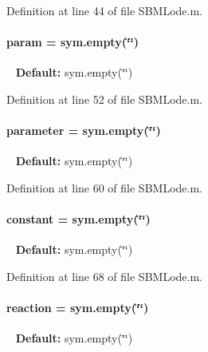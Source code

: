Definition at line 44 of file S\+B\+M\+Lode.\+m.

\hypertarget{class_s_b_m_lode_a51f20d6b1b54a2eee3be0e8adc96a0ae}{}
\paragraph[{param}]{\setlength{\rightskip}{0pt plus 5cm}param = sym.\+empty(\char`\"{}\char`\"{})}\label{class_s_b_m_lode_a51f20d6b1b54a2eee3be0e8adc96a0ae}
~\newline
{\bfseries Default\+:} sym.\+empty(\char`\"{}\char`\"{}) 

Definition at line 52 of file S\+B\+M\+Lode.\+m.

\hypertarget{class_s_b_m_lode_a0d71b5c1dcca8d3fee88d6a11d3e2071}{}
\paragraph[{parameter}]{\setlength{\rightskip}{0pt plus 5cm}parameter = sym.\+empty(\char`\"{}\char`\"{})}\label{class_s_b_m_lode_a0d71b5c1dcca8d3fee88d6a11d3e2071}
~\newline
{\bfseries Default\+:} sym.\+empty(\char`\"{}\char`\"{}) 

Definition at line 60 of file S\+B\+M\+Lode.\+m.

\hypertarget{class_s_b_m_lode_a391f14c28a859734cd091e4e521bb8f8}{}
\paragraph[{constant}]{\setlength{\rightskip}{0pt plus 5cm}constant = sym.\+empty(\char`\"{}\char`\"{})}\label{class_s_b_m_lode_a391f14c28a859734cd091e4e521bb8f8}
~\newline
{\bfseries Default\+:} sym.\+empty(\char`\"{}\char`\"{}) 

Definition at line 68 of file S\+B\+M\+Lode.\+m.

\hypertarget{class_s_b_m_lode_ab342dbdf93b408b2c4bc416ea1701178}{}
\paragraph[{reaction}]{\setlength{\rightskip}{0pt plus 5cm}reaction = sym.\+empty(\char`\"{}\char`\"{})}\label{class_s_b_m_lode_ab342dbdf93b408b2c4bc416ea1701178}
~\newline
{\bfseries Default\+:} sym.\+empty(\char`\"{}\char`\"{}) 

